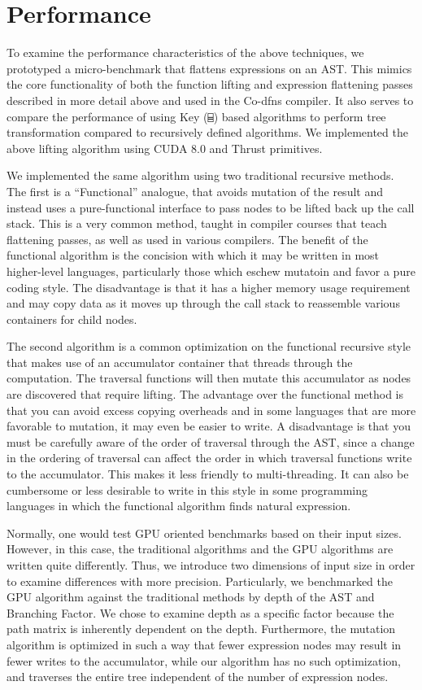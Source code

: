 ﻿\documentclass[numbers,10pt,preprint]{sigplanconf}
\begin{document}
\section{Performance}

To examine the performance characteristics of the above techniques, we prototyped a micro-benchmark that flattens expressions on an AST. This mimics the core functionality of both the function lifting and expression flattening passes described in more detail above and used in the Co-dfns compiler. It also serves to compare the performance of using Key (\verb;⌸;) based algorithms to perform tree transformation compared to recursively defined algorithms. We implemented the above lifting algorithm using CUDA 8.0 and Thrust primitives. 

We implemented the same algorithm using two traditional recursive methods. The first is a ``Functional'' analogue, that avoids mutation of the result and instead uses a pure-functional interface to pass nodes to be lifted back up the call stack. This is a very common method, taught in compiler courses that teach flattening passes, as well as used in various compilers. The benefit of the functional algorithm is the concision with which it may be written in most higher-level languages, particularly those which eschew mutatoin and favor a pure coding style. The disadvantage is that it has a higher memory usage requirement and may copy data as it moves up through the call stack to reassemble various containers for child nodes.

The second algorithm is a common optimization on the functional recursive style that makes use of an accumulator container that threads through the computation. The traversal functions will then mutate this accumulator as nodes are discovered that require lifting. The advantage over the functional method is that you can avoid excess copying overheads and in some languages that are more favorable to mutation, it may even be easier to write. A disadvantage is that you must be carefully aware of the order of traversal through the AST, since a change in the ordering of traversal can affect the order in which traversal functions write to the accumulator. This makes it less friendly to multi-threading. It can also be cumbersome or less desirable to write in this style in some programming languages in which the functional algorithm finds natural expression.

Normally, one would test GPU oriented benchmarks based on their input sizes. However, in this case, the traditional algorithms and the GPU algorithms are written quite differently. Thus, we introduce two dimensions of input size in order to examine differences with more precision. Particularly, we benchmarked the GPU algorithm against the traditional methods by depth of the AST and Branching Factor. We chose to examine depth as a specific factor because the path matrix is inherently dependent on the depth. Furthermore, the mutation algorithm is optimized in such a way that fewer expression nodes may result in fewer writes to the accumulator, while our algorithm has no such optimization, and traverses the entire tree independent of the number of expression nodes. 
\end{document}
